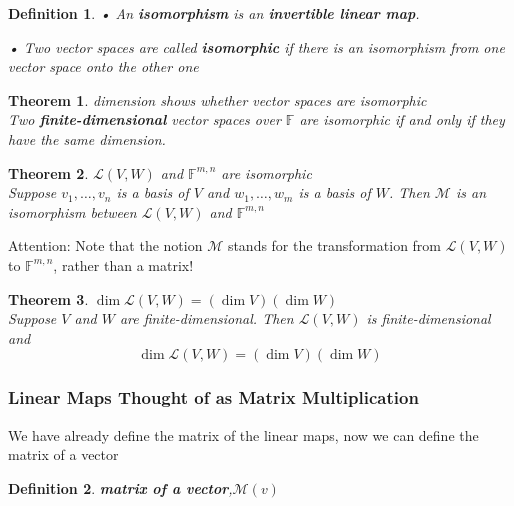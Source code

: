 \documentclass{article}
\newtheorem{theorem}{Theorem}[subsection]
\newtheorem{definition}{Definition}[subsection]
\newcommand{\FF}{\mathbb{F}}
\begin{document}
\begin{CJK}{UTF8}{gkai}
\begin{definition}
    • An \textbf{isomorphism} is an \textbf{invertible linear map}.

    • Two vector spaces are called \textbf{isomorphic} if there is an isomorphism from one vector space onto the other one\\
\end{definition}

\begin{theorem}
    dimension shows whether vector spaces are isomorphic\\

    Two \textbf{finite-dimensional} vector spaces over $\FF$ are isomorphic if and only if they have the same dimension.\\
\end{theorem}

\begin{theorem}
    $\mathcal{L}(V,W)$ and $\FF^{m,n}$ are isomorphic\\

    Suppose $v_1,\ldots,v_n$ is a basis of $V$ and $w_1,\ldots,w_m$ is a basis of $W$. Then $\mathcal{M}$ is
    an isomorphism between $\mathcal{L}(V,W)$ and $\FF^{m,n}$\\
\end{theorem}

Attention: Note that the notion $\mathcal{M}$ stands for the transformation from $\mathcal{L}(V,W)$ to $\FF^{m,n}$, rather than a matrix!\\

\begin{theorem}
    $\dim\mathcal{L}(V,W) = (\dim V)(\dim W)$\\

    Suppose $V$ and $W$ are finite-dimensional. Then $\mathcal{L}(V,W)$ is finite-dimensional and
    \[\dim\mathcal{L}(V,W) = (\dim V)(\dim W)\]  
\end{theorem}

\subsubsection{Linear Maps Thought of as Matrix Multiplication}
We have already define the matrix of the linear maps, now we can define the matrix of a vector\\

\begin{definition}
    \textbf{matrix of a vector},$\mathcal{M}(v)$\\


\end{definition}
\end{CJK}
\end{document}
